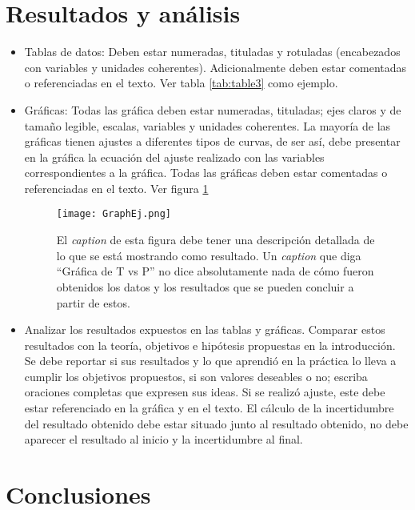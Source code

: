 \documentclass[a4paper, amsfonts, amssymb, amsmath, reprint, showkeys, nofootinbib, twoside]{revtex4-1}
\begin{document}
\section{Resultados y análisis}

\begin{itemize}
    \item Tablas de datos: Deben estar numeradas, tituladas y rotuladas (encabezados con variables y  unidades  coherentes).  Adicionalmente  deben  estar  comentadas  o  referenciadas  en  el texto. Ver tabla \ref{tab:table3} como ejemplo. 
    \item Gráficas: Todas las gráfica deben estar numeradas, tituladas; ejes claros y de tamaño legible, escalas, variables y unidades coherentes. La mayoría de las gráficas tienen ajustes a diferentes tipos de curvas, de ser así, debe presentar en la gráfica la ecuación del ajuste realizado  con  las  variables  correspondientes  a  la  gráfica.  Todas las gráficas deben estar comentadas o referenciadas en el texto. Ver figura \ref{fig:my_label}
    
    \begin{figure}[H]
    \centering
    \texttt{[image: GraphEj.png]}
    \caption{El \emph{caption} de esta figura debe tener una descripción detallada de lo que se está mostrando como resultado. Un \emph{caption} que diga ``Gráfica de T vs P'' no dice absolutamente nada de cómo fueron obtenidos los datos y los resultados que se pueden concluir a partir de estos.}
    \label{fig:my_label}
    \end{figure}

    \item Analizar los resultados expuestos en las tablas y gráficas. Comparar estos resultados con la teoría, objetivos e hipótesis propuestas en la introducción. Se debe reportar si sus resultados y lo que aprendió en la práctica lo lleva a cumplir los objetivos propuestos, si son valores deseables o no; escriba oraciones completas que expresen sus ideas. Si se realizó ajuste, este debe estar referenciado en la gráfica y en el texto. El cálculo de la incertidumbre del resultado obtenido debe estar situado junto al resultado obtenido, no debe aparecer el resultado al inicio y la incertidumbre al final.

\end{itemize}





\section{Conclusiones}
\end{document}
